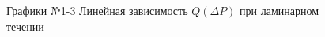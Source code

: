 \documentclass[a4paper]{article}
\begin{document}
\begin{enumerate}
\begin{figure}[h!]
\caption[]{\label{} Графики №1-3 Линейная зависимость $Q(\Delta P)$ при ламинарном течении}
\end{figure}
\clearpage
\begin{figure}[h!]

\end{figure}
\end{enumerate}
\end{document}
